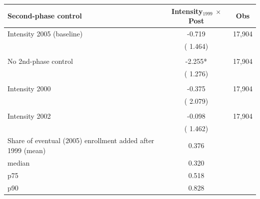 \begin{tabular}{lcc} \hline \hline
Second-phase control & Intensity$_{1999}$ $\times$ Post & Obs \\ \toprule
Intensity 2005 (baseline) & -0.719 &       17,904 \\ 
 & (    1.464) & \\ 
  & & \\ 
No 2nd-phase control & -2.255* &       17,904 \\ 
 & (    1.276) & \\ 
  & & \\ 
Intensity 2000 & -0.375 &       17,904 \\ 
 & (    2.079) & \\ 
  & & \\ 
Intensity 2002 & -0.098 &       17,904 \\ 
 & (    1.462) & \\ 
\bottomrule
Share of eventual (2005) enrollment added after 1999 (mean) & 0.376 & \\ 
\quad median & 0.320 & \\ 
\quad p75 & 0.518 & \\ 
\quad p90 & 0.828 & \\ 
\end{tabular}